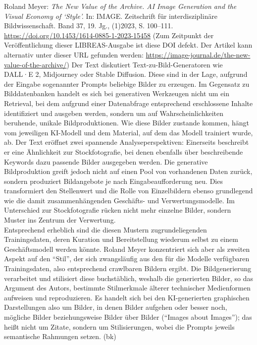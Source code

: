 \documentclass[a4paper,
fontsize=11pt,
oneside,
numbers=noperiodatend,
parskip=half-,
bibliography=totoc,
final
]{scrartcl}
\begin{document}
Roland Meyer: \emph{The New Value of the Archive. AI Image Generation
and the Visual Economy of \enquote*{Style}.} In: IMAGE. Zeitschrift für
interdisziplinäre Bildwissenschaft. Band 37, 19. Jg., (1)2023, S.
100--111. \url{https://doi.org/10.1453/1614-0885-1-2023-15458} (Zum
Zeitpunkt der Veröffentlichung dieser LIBREAS-Ausgabe ist diese DOI
defekt. Der Artikel kann alternativ unter dieser URL gefunden werden:
\url{https://image-journal.de/the-new-value-of-the-archive/}) Der Text
diskutiert Text-zu-Bild-Generatoren wie DALL·E 2, Midjourney oder Stable
Diffusion. Diese sind in der Lage, aufgrund der Eingabe sogenannter
Prompts beliebige Bilder zu erzeugen. Im Gegensatz zu Bilddatenbanken
handelt es sich bei generativen Werkzeugen nicht um ein Retrieval, bei
dem aufgrund einer Datenabfrage entsprechend erschlossene Inhalte
identifiziert und ausgeben werden, sondern um auf Wahrscheinlichkeiten
beruhende, unikale Bildproduktionen. Wie diese Bilder zustande kommen,
hängt vom jeweiligen KI-Modell und dem Material, auf dem das Modell
trainiert wurde, ab. Der Text eröffnet zwei spannende
Analyseperspektiven: Einerseits beschreibt er eine Ähnlichkeit zur
Stockfotografie, bei denen ebenfalls über beschreibende Keywords dazu
passende Bilder ausgegeben werden. Die generative Bildproduktion greift
jedoch nicht auf einen Pool von vorhandenen Daten zurück, sondern
produziert Bildangebote je nach Eingabeaufforderung neu. Dies
transformiert den Stellenwert und die Rolle von Einzelbildern ebenso
grundlegend wie die damit zusammenhängenden Geschäfts- und
Verwertungsmodelle. Im Unterschied zur Stockfotografie rücken nicht mehr
einzelne Bilder, sondern Muster ins Zentrum der Verwertung.\\
Entsprechend erheblich sind die diesen Mustern zugrundeliegenden
Trainingsdaten, deren Kuration und Bereitstellung wiederum selbst zu
einem Geschäftsmodell werden könnte. Roland Meyer konzentriert sich aber
als zweiten Aspekt auf den \enquote{Stil}, der sich zwangsläufig aus den
für die Modelle verfügbaren Trainingsdaten, also entsprechend crawlbaren
Bildern ergibt. Die Bildgenerierung verarbeitet und stilisiert diese
buchstäblich, weshalb die generierten Bilder, so das Argument des
Autors, bestimmte Stilmerkmale älterer technischer Medienformen
aufweisen und reproduzieren. Es handelt sich bei den KI-generierten
graphischen Darstellungen also um Bilder, in denen Bilder aufgehen oder
besser noch, mögliche Bilder beziehungsweise Bilder über Bilder
(\enquote{Images about Images}); das heißt nicht um Zitate, sondern um
Stilisierungen, wobei die Prompts jeweils semantische Rahmungen setzen.
(bk)
\end{document}
